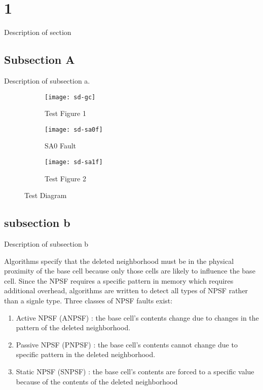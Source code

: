 \section{1}
\label{sect:A}
Description of section

\subsection{Subsection A}
Description of subsection a.
\begin{figure}[H]
  \centering
  \begin{subfigure}[b]{0.5\textwidth}
    \texttt{[image: sd-gc]}
    \caption{Test Figure 1}
    \label{fig:sd-gc}
  \end{subfigure}  
  
  \begin{subfigure}[b]{0.25\textwidth}
    \texttt{[image: sd-sa0f]}
    \caption{SA0 Fault}
    \label{fig:sd-sa0f}
  \end{subfigure}  
  \begin{subfigure}[b]{0.25\textwidth}
    \texttt{[image: sd-sa1f]}
    \caption{Test Figure 2}
    \label{fig:sd-sa1f}
  \end{subfigure}  

  \caption[Test Diagram]{Test Diagram \cite{VanDeGoor1991}}
  \label{fig:sd-sc}
\end{figure}

\subsection{subsection b}
Description of subsection b

Algorithms specify that the deleted neighborhood must be in the physical proximity of the base cell because only those cells are likely to influence the base cell.  Since the NPSF requires a specific pattern in memory which requires additional overhead, algorithms are written to detect all types of NPSF rather than a signle type.  Three classes of NPSF faults exist:
\begin{enumerate}
  \item Active NPSF (ANPSF) \cite{1675601}: the base cell's contents change due to changes in the pattern of the deleted neighborhood.
  \item Passive NPSF (PNPSF) \cite{1675601}: the base cell's contents cannot change due to specific pattern in the deleted neighborhood.
  \item Static NPSF (SNPSF) \cite{1676572}: the base cell's contents are forced to a specific value because of the contents of the deleted neighborhood
\end{enumerate}
